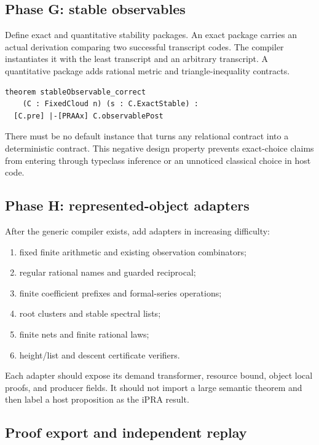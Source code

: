 \subsection{Phase G: stable observables}

Define exact and quantitative stability packages.  An exact package carries an actual derivation comparing two successful transcript codes.  The compiler instantiates it with the least transcript and an arbitrary transcript.  A quantitative package adds rational metric and triangle-inequality contracts.

\begin{lstlisting}[language=Lean]
theorem stableObservable_correct
    (C : FixedCloud n) (s : C.ExactStable) :
  [C.pre] |-[PRAAx] C.observablePost
\end{lstlisting}

There must be no default instance that turns any relational contract into a deterministic contract.  This negative design property prevents exact-choice claims from entering through typeclass inference or an unnoticed classical choice in host code.

\subsection{Phase H: represented-object adapters}

After the generic compiler exists, add adapters in increasing difficulty:

\begin{enumerate}
  \item fixed finite arithmetic and existing observation combinators;
  \item regular rational names and guarded reciprocal;
  \item finite coefficient prefixes and formal-series operations;
  \item root clusters and stable spectral lists;
  \item finite nets and finite rational laws;
  \item height/list and descent certificate verifiers.
\end{enumerate}

Each adapter should expose its demand transformer, resource bound, object local proofs, and producer fields.  It should not import a large semantic theorem and then label a host proposition as the iPRA result.

\subsection{Proof export and independent replay}

